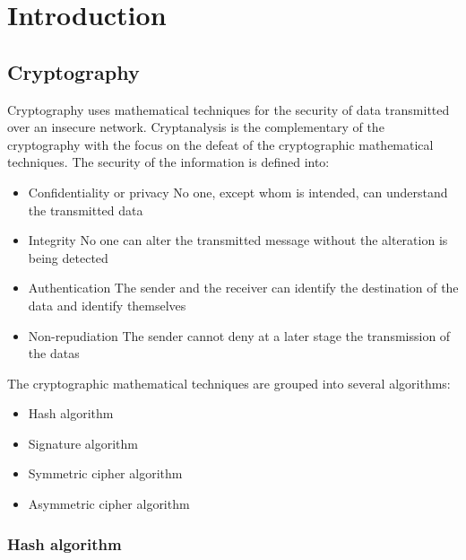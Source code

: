 ﻿\chapter{Introduction}
\section{Cryptography} %
Cryptography uses mathematical techniques for the security of data transmitted
over an insecure network. \newline
Cryptanalysis is the complementary of the cryptography
with the focus on the defeat of the cryptographic mathematical
techniques.\newline
The security of the information is defined into:
\begin{itemize}
  \item Confidentiality or privacy\newline
  No one, except whom is intended, can understand the transmitted data
  \item Integrity\newline
  No one can alter the transmitted message without the alteration is being
  detected
  \item Authentication \newline
  The sender and the receiver can identify the destination of the data and
  identify themselves
  \item Non-repudiation\newline
  The sender cannot deny at a later stage the transmission of the datas\newline
\end{itemize}
The cryptographic mathematical techniques are grouped into several algorithms:
\begin{itemize}
  \item Hash algorithm
  \item Signature algorithm
  \item Symmetric cipher algorithm
  \item Asymmetric cipher algorithm
\end{itemize}


\newpage
\subsection{Hash algorithm}
\label{intro_hash}

